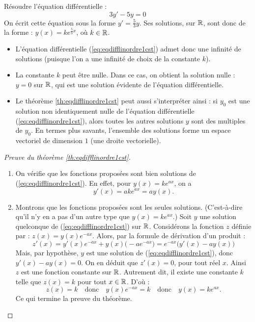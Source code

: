 \documentclass[class=report,crop=false]{standalone}
\begin{document}
\begin{exemple}
Résoudre l'équation différentielle :
$$3y' - 5y = 0$$
On écrit cette équation sous la forme $y' = \frac53 y$.
Ses solutions, sur $\mathbb{R}$, sont donc de la forme :
$y(x) = k e^{\frac53x}$, où $k \in \mathbb{R}$.
\end{exemple}

\begin{remarque*}
\sauteligne
\begin{itemize}
  \item L'équation différentielle (\ref{eq:eqdifflinordre1cst})
admet donc une infinité de solutions (puisque l'on a une
infinité de choix de la constante $k$).

  \item La constante $k$ peut être nulle. Dans ce cas, on obtient
  la \og solution nulle \fg{} : $y = 0$ sur $\mathbb{R}$, qui est une solution
  évidente de l'équation différentielle.

  \item Le théorème \ref{th:eqdifflinordre1cst} peut aussi s'interpréter ainsi :
  si $y_0$ est une solution non identiquement nulle de
l'équation différentielle (\ref{eq:eqdifflinordre1cst}),
alors toutes les autres solutions $y$ sont des multiples de $y_0$. En termes plus savants,
l'ensemble des solutions forme un espace vectoriel de dimension $1$ (une droite vectorielle).
\end{itemize}
\end{remarque*}


\begin{proof}[Preuve du théorème \ref{th:eqdifflinordre1cst}]
~
\begin{enumerate}
  \item On vérifie que les fonctions proposées sont bien solutions de (\ref{eq:eqdifflinordre1cst}).
  En effet, pour $y(x) = k e^{ax}$, on a
  $$y'(x) = ake^{ax} = a y(x).$$

  \item Montrons que les fonctions proposées sont les seules solutions.
  (C'est-à-dire qu'il n'y en a pas d'un autre type que $y(x)= k e^{ax}$.)
  Soit $y$ une solution quelconque de (\ref{eq:eqdifflinordre1cst}) sur $\mathbb{R}$.
  Considérons la fonction $z$ définie par : $z(x) = y(x) e^{-ax}$.
  Alors, par la formule de dérivation d'un produit :
  $$z'(x) = y'(x)e^{-ax} +  y(x)\big(-ae^{-ax}\big) =  e^{-ax}\big(y'(x)-ay(x)\big)$$
  Mais, par hypothèse, $y$ est une solution de (\ref{eq:eqdifflinordre1cst}),
  donc $y'(x) - ay(x) = 0$. On en déduit que $z'(x) = 0$, pour tout réel $x$.
  Ainsi $z$ est une fonction constante sur $\mathbb{R}$.
  Autrement dit, il existe une constante $k$ telle que $z(x)=k$ pour tout $x\in \mathbb{R}$.
  D'où :
  $$z(x)= k \quad\text{donc}\quad  y(x) e^{-ax} = k \quad\text{donc}\quad
  y(x) = ke^{ax}.$$
  Ce qui termine la preuve du théorème.
\end{enumerate}


\end{proof}
\end{document}
